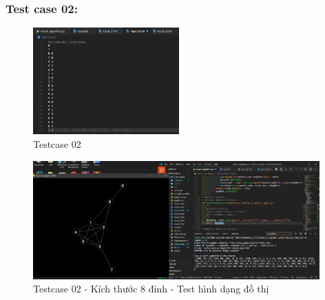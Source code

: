 \documentclass{article}
\begin{document}
\subsubsection{Test case 02:}
\begin{figure}[H]
\centering
\includegraphics[width=0.5\textwidth]{Test_Case_02_Content.png}
\caption{Testcase 02}
\end{figure}
\begin{figure}[H]
\centering
\includegraphics[width=0.98\textwidth]{Test_Case_02.png}
\caption{Testcase 02 - Kích thước 8 đỉnh - Test hình dạng đồ thị}
\end{figure}
\end{document}
